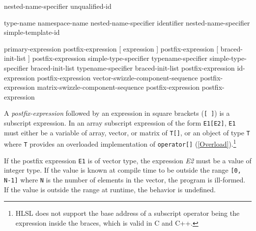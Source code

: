 
\begin{grammar}
  \br
  nested-name-specifier  unqualified-id\br

  \br
  \terminal{::}\br
  type-name \terminal{::}\br
  namespace-name \terminal{::}\br
  nested-name-specifier identifier \terminal{::}\br
  nested-name-specifier  simple-template-id \terminal{::}
\end{grammar}


\begin{grammar}
  \br
  primary-expression\br
  postfix-expression [ expression ]\br
  postfix-expression [ braced-init-list ]\br %
  postfix-expression \terminal{(}  \terminal{)}\br
  simple-type-specifier \terminal{(}  \terminal{)}\br
  typename-specifier \terminal{(}  \terminal{)}\br
  simple-type-specifier braced-init-list\br
  typename-specifier braced-init-list\br
  postfix-expression   id-expression\br
  postfix-expression  vector-swizzle-component-sequence\br
  postfix-expression  matrix-swizzle-component-sequence\br
  postfix-expression \terminal{++}\br
  postfix-expression \terminal{--}
\end{grammar}


\p A \textit{postfix-expression} followed by an expression in square brackets
(\texttt{[ ]}) is a subscript expression. In an array subscript expression of
the form \texttt{E1[E2]}, \texttt{E1} must either be a variable of array,
vector, or matrix of \texttt{T[]}, or an object of type \texttt{T} where
\texttt{T} provides an overloaded implementation of \texttt{operator[]}
(\ref{Overload}).\footnote{HLSL does not support the base address of a subscript
operator being the expression inside the braces, which is valid in C and C++.}

\p If the postfix expression \texttt{E1} is of vector type, the expression
\textit{E2} must be a value of integer type. If the value is known at compile
time to be outside the range \texttt{[0, N-1]} where \texttt{N} is the number of
elements in the vector, the program is ill-formed. If the value is outside the
range at runtime, the behavior is undefined.

